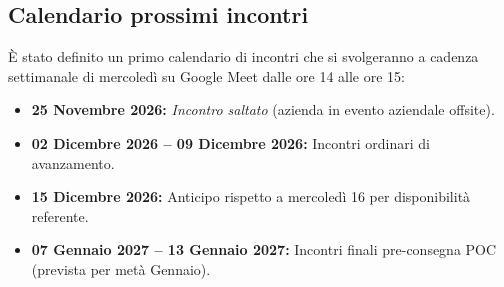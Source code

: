 \subsection{Calendario prossimi incontri}
È stato definito un primo calendario di incontri che si svolgeranno a cadenza settimanale di mercoledì su Google Meet dalle ore 14 alle ore 15:
\begin{itemize}
    \item \textbf{25 Novembre 2026:} \textit{Incontro saltato} (azienda in evento aziendale offsite).
    \item \textbf{02 Dicembre 2026 -- 09 Dicembre 2026:} Incontri ordinari di avanzamento.
    \item \textbf{15 Dicembre 2026:} Anticipo rispetto a mercoledì 16 per disponibilità referente.
    \item \textbf{07 Gennaio 2027 -- 13 Gennaio 2027:} Incontri finali pre-consegna POC (prevista per metà Gennaio).
\end{itemize}

